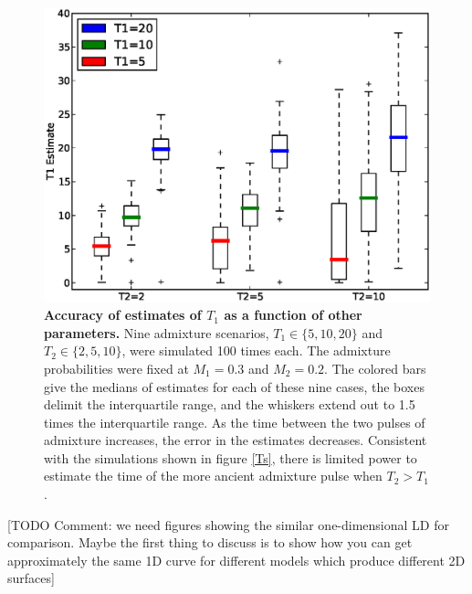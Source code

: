 \documentclass[10pt]{article}
\begin{document}
\begin{figure} \includegraphics[scale=.6]{estimates.eps} \caption{ {\bf Accuracy
of estimates of $T_1$ as a function of other parameters.} Nine admixture
scenarios, $T_1\in \{5,10,20\}$ and $T_2\in\{2,5,10\}$, were simulated 100 times
each. The admixture probabilities were fixed at $M_1=0.3$ and $M_2=0.2$. The
colored bars give the medians of estimates for each of these nine cases, the
boxes delimit the interquartile range, and the whiskers extend out to 1.5 times
the interquartile range. As the time between the two pulses of admixture
increases, the error in the estimates decreases. Consistent with the simulations
shown in figure \ref{Ts}, there is limited power to estimate the time of the
more ancient admixture pulse when $T_2>T_1$. } \label{estimates} \end{figure}

[TODO Comment: we need  figures showing the similar one-dimensional LD for
comparison.  Maybe the first thing to discuss is to show how you can get
approximately the same 1D curve for different models which produce different 2D
surfaces]
\end{document}
